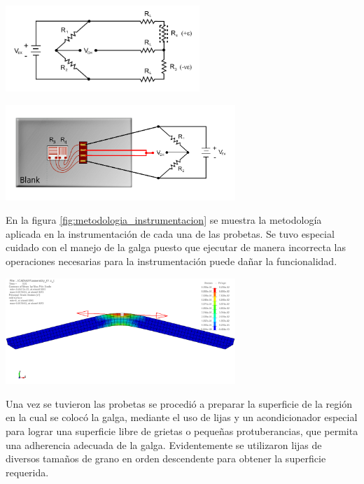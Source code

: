 \begin{center}
\includegraphics[width=0.55\textwidth]{src/ch3/circuito_conexion.pdf}
\label{fig:circuito_conexion}
\end{center}

\begin{center}
\includegraphics[width=0.65\textwidth]{src/ch3/diagrama_conexion.pdf}
\label{fig:diagrama_conexion}
\end{center}

En la figura \ref{fig:metodologia_instrumentacion} se muestra la metodología aplicada 
en la instrumentación de cada una de las probetas. Se tuvo especial cuidado con el 
manejo de la galga puesto que ejecutar de manera incorrecta las operaciones necesarias 
para la instrumentación puede dañar la funcionalidad. \\

\begin{center}
\includegraphics[width=0.65\textwidth]{src/ch3/dir_prin_strain.png}
\label{fig:dir_prin_strain}
\end{center}

Una vez se tuvieron las probetas se procedió a preparar la superficie de la región en 
la cual se colocó la galga, mediante el uso de lijas y un acondicionador especial 
para lograr una superficie libre de grietas o pequeñas protuberancias, que permita 
una adherencia adecuada de la galga. Evidentemente se utilizaron lijas de diversos 
tamaños de grano en orden descendente para obtener la superficie requerida.\\

